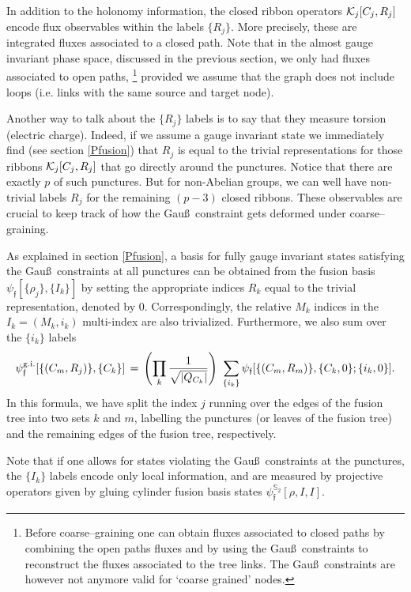 \documentclass[nofootinbib,superscriptaddress,eqsecnum,tightenlines,11pt]{revtex4-1}
\def\ba{\begin{eqnarray}}
\def\ea{\end{eqnarray}}
\begin{document}
In addition to the holonomy information, the closed ribbon operators ${\cal K}_j[C_j,R_j]$ encode flux observables within the labels $\{R_j\}$. 
More precisely, these are integrated fluxes associated to a closed path. 
Note that in the almost gauge invariant phase space, discussed in the previous section, we only had fluxes associated to open paths,%
\footnote{Before coarse--graining one can obtain fluxes associated to closed paths by combining the open paths fluxes and by using the Gau\ss~constraints to reconstruct the fluxes associated to the tree links. The  Gau\ss~constraints are however not anymore valid for `coarse grained' nodes.}
provided we assume that the graph does not include loops (i.e. links with the same source and target node).  

 Another way to talk about the $\{R_j\}$ labels is to say that they measure torsion (electric charge). 
Indeed, if we assume a gauge invariant state we immediately find (see section \ref{Pfusion}) that $R_j$ is equal to the trivial representations for those ribbons ${\cal K}_j[C_j,R_j]$ that go directly around the punctures.
Notice that there are exactly $p$ of such punctures.
But for non-Abelian groups, we can well have non-trivial labels $R_j$ for the remaining $(p-3)$ closed ribbons. 
These observables are crucial to keep track of how the Gau\ss~constraint gets deformed under coarse--graining.


As explained in section \ref{Pfusion}, a basis for fully gauge invariant states satisfying the Gau\ss~constraints at all punctures can be obtained from the fusion basis $\psi_{\mathfrak{f}}[\{\rho_j\},\{I_k\}]$ by setting the appropriate indices $R_k$ equal to the trivial representation, denoted by $0$. Correspondingly, the relative $M_k$ indices in the $I_k=(M_k, i_k)$ multi-index are also trivialized. 
Furthermore, we also sum over the $\{i_k\}$ labels 
\ba
\psi^{\rm g.i.}_{\mathfrak{f}}[\{(C_{m},R_{j})\}, \{C_k\}]\,=\,  \left(\prod_k  \frac{1}{\sqrt{ |Q_{C_k}|}}\right)  \,\, \sum_{\{i_k\}} \psi_{\mathfrak{f}}[\{(C_{m},R_{m})\}, \{C_{k},0\}; \{i_k,0\}].
\ea
In this formula, we have split the index $j$ running over the edges of the fusion tree into two sets $k$ and $m$, labelling the punctures (or leaves of the fusion tree) and the remaining edges of the fusion tree, respectively.


Note that if one allows for states violating the Gau\ss~constraints at the punctures, the $\{I_k\}$ labels encode only local information, and are measured by projective operators given by gluing cylinder fusion basis states $\psi_{\mathfrak{f}}^{\mathbb{S}_2}[\rho, I,I]$. 
\end{document}
